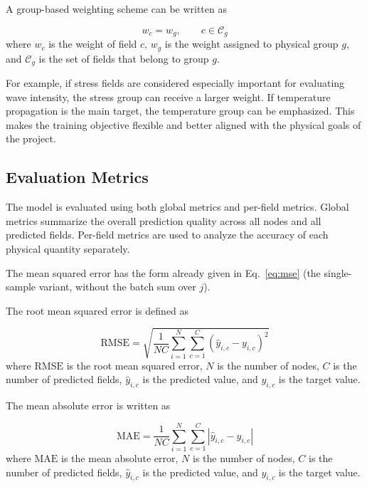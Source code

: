 A group-based weighting scheme can be written as

\begin{equation}
w_c = w_g,
\qquad
c \in \mathcal{C}_g
\end{equation}
where \(w_c\) is the weight of field \(c\), \(w_g\) is the weight assigned to physical group \(g\), and \(\mathcal{C}_g\) is the set of fields that belong to group \(g\).

For example, if stress fields are considered especially important for evaluating wave intensity, the stress group can receive a larger weight. If temperature propagation is the main target, the temperature group can be emphasized. This makes the training objective flexible and better aligned with the physical goals of the project.

\subsection{Evaluation Metrics}

The model is evaluated using both global metrics and per-field metrics. Global metrics summarize the overall prediction quality across all nodes and all predicted fields. Per-field metrics are used to analyze the accuracy of each physical quantity separately.

The mean squared error has the form already given in Eq.~\eqref{eq:mse} (the single-sample variant, without the batch sum over $j$).

The root mean squared error is defined as

\begin{equation}
\mathrm{RMSE}
=
\sqrt{
\frac{1}{NC}
\sum_{i=1}^{N}
\sum_{c=1}^{C}
\left(
\hat{y}_{i,c}
-
y_{i,c}
\right)^2
}
\end{equation}
where \(\mathrm{RMSE}\) is the root mean squared error, \(N\) is the number of nodes, \(C\) is the number of predicted fields, \(\hat{y}_{i,c}\) is the predicted value, and \(y_{i,c}\) is the target value.

The mean absolute error is written as

\begin{equation}
\mathrm{MAE}
=
\frac{1}{NC}
\sum_{i=1}^{N}
\sum_{c=1}^{C}
\left|
\hat{y}_{i,c}
-
y_{i,c}
\right|
\end{equation}
where \(\mathrm{MAE}\) is the mean absolute error, \(N\) is the number of nodes, \(C\) is the number of predicted fields, \(\hat{y}_{i,c}\) is the predicted value, and \(y_{i,c}\) is the target value.

